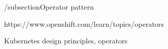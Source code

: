 /subsection{Operator pattern}

https://www.openshift.com/learn/topics/operators

Kubernetes design principles, operators